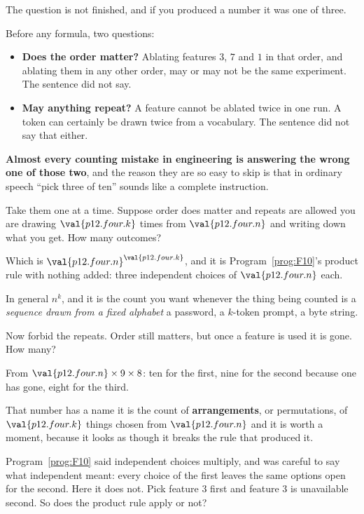 \begin{fr}
\begin{ansblock}
The question is not finished, and if you produced a number it was one of
three.
\end{ansblock}

Before any formula, two questions:

\begin{itemize}
\item \textbf{Does the order matter?} Ablating features $3$, $7$ and $1$ in
  that order, and ablating them in any other order, may or may not be the same
  experiment. The sentence did not say.
\item \textbf{May anything repeat?} A feature cannot be ablated twice in one
  run. A token can certainly be drawn twice from a vocabulary. The sentence
  did not say that either.
\end{itemize}

\textbf{Almost every counting mistake in engineering is answering the wrong
one of those two}, and the reason they are so easy to skip is that in ordinary
speech \enquote{pick three of ten} sounds like a complete instruction.

Take them one at a time. Suppose order does matter and repeats are allowed
\dash{} you are drawing $\val{p12.four.k}$ times from
$\val{p12.four.n}$ and writing down what you get. How many outcomes?
\nextframe
\end{fr}

\begin{fr}
Which is $\val{p12.four.n}^{\val{p12.four.k}}$, and it is
Program~\ref{prog:F10}'s product rule with nothing added: three independent
choices of $\val{p12.four.n}$ each.

In general \textbf{$n^{k}$}, and it is the count you want whenever the thing
being counted is a \emph{sequence drawn from a fixed alphabet} \dash{} a
password, a $k$-token prompt, a byte string.

Now forbid the repeats. Order still matters, but once a feature is used it is
gone. How many?
\dotline
\nextframe
\end{fr}

\begin{fr}
From $\val{p12.four.n} \times 9 \times 8$: ten for the first, nine for the
second because one has gone, eight for the third.

That number has a name \dash{} it is the count of \textbf{arrangements}, or
permutations, of $\val{p12.four.k}$ things chosen from $\val{p12.four.n}$
\dash{} and it is worth a moment, because it looks as though it breaks the
rule that produced it.

Program~\ref{prog:F10} said independent choices multiply, and was careful to
say what independent meant: every choice of the first leaves the same options
open for the second. Here it does not. Pick feature $3$ first and feature $3$
is unavailable second. So does the product rule apply or not?
\nextframe
\end{fr}

